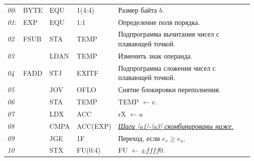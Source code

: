 \begin{longtable}{l l l l l}
\textit{00}: & BYTE & EQU & 1(4:4) & Размер байта $b$.\\
\textit{01}: & EXP & EQU & 1:1 & Определение поля порядка.\\
\textit{02} & FSUB & STA & TEMP &	Подпрограмма вычитания чисел с плавающей точкой.\\
\textit{03} & & LDAN & TEMP & Изменить знак операнда.\\
\textit{04} & FADD & STJ & EXITF &	Подпрограмма сложения чисел с плавающей точкой.\\
\textit{05}	& & JOV & OFLO & Снятие блокировки переполнения.\\
\textit{06}	& & STA & TEMP & TEMP $\leftarrow v$.\\
\textit{07}	& & LDX & ACC & rX $\leftarrow u$\\
\textit{08}	& & CMPA & ACC(EXP)	& \underline{\textit{Шаги \ref{a1}-\ref{a3} скомбинированы ниже.}}\\
\textit{09}	& & JGE & 1F & Переход, если $e_v \geq e_u$.\\
\textit{10}	& & STX & FU(0:4) & FU $\leftarrow \pm f f f f 0$.\\


\end{longtable}
